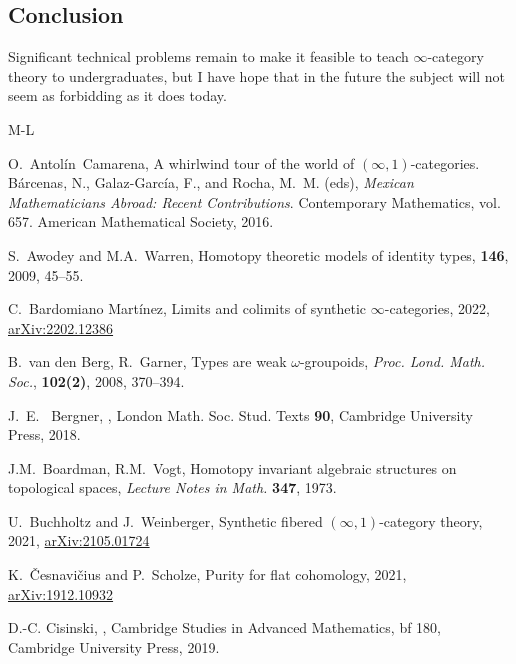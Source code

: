 \documentclass[11pt]{ctexart}
\theoremstyle{definition}
\theoremstyle{remark}
\numberwithin{equation}{section}
\newcommand{\1}{\mathbbe{1}}
\newcommand{\2}{\mathbbe{2}}
\newcommand{\3}{\mathbbe{3}}
\begin{document}
\subsection*{Conclusion}

Significant technical problems remain to make it feasible to teach  $\infty$-category theory to undergraduates, but I have hope that in the future the subject  will not seem as forbidding as it does today. 


\begin{thebibliography}{M-L}

        O.~Antol\'{i}n~Camarena,     \newblock A whirlwind tour of the world of $(\infty,1)$-categories.     B\'{a}rcenas, N., Galaz-Garc\'{i}a, F.,      and Rocha, M.~M. (eds), {\em Mexican Mathematicians Abroad: Recent   Contributions}. \newblock Contemporary Mathematics, vol. 657.   \newblock American Mathematical Society, 2016.
    

     S.~Awodey and M.A.~Warren,   \newblock Homotopy theoretic models of identity types,      {\bf 146}, 2009, 45--55.
 
 C.~Bardomiano Mart\'{i}nez, Limits and colimits of synthetic $\infty$-categories, 2022, \href{https://arxiv.org/abs/2202.12386}{arXiv:2202.12386}

  B.~van den Berg, R.~Garner, Types are weak $\omega$-groupoids,
 {\em Proc. Lond. Math. Soc.}, {\bf 102(2)}, 2008, 370--394.
    
    J.~E.~ Bergner,  
    ,  London Math. Soc. Stud. Texts {\bf 90}, 
    \newblock Cambridge University Press, 2018.
    

 J.M.~Boardman, R.M.~Vogt, Homotopy invariant algebraic structures on topological spaces, {\em Lecture Notes in Math.} {\bf 347}, 1973.

 U.~Buchholtz and J.~Weinberger, Synthetic fibered $(\infty, 1)$-category theory, 2021, \href{https://arxiv.org/abs/2105.01724}{arXiv:2105.01724}

 K.~\v{C}esnavi\v{c}ius and P.~Scholze, Purity for flat cohomology, 2021, \href{https://arxiv.org/pdf/1912.10932.pdf}{arXiv:1912.10932}

        D.-C. Cisinski,     ,     \newblock Cambridge Studies in Advanced Mathematics, {bf 180}, \newblock Cambridge University Press, 2019.
 


\end{thebibliography}
\end{document}
